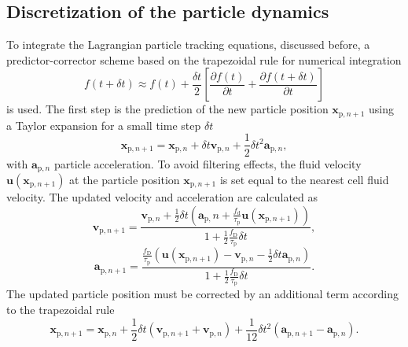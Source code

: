 \documentclass[11pt,a4paper,openany,oneside,parskip=half*]{article}
\renewcommand*\vec[1]{\boldsymbol{#1}}
\begin{document}
\subsection{Discretization of the particle dynamics}
To integrate the Lagrangian particle tracking equations, discussed before, a predictor-corrector scheme based on the trapezoidal rule for numerical integration
\begin{equation}
f (t + \delta t) \approx f(t) + \frac{\delta t}{2} \left[ \frac{\partial f(t)}{\partial t} + \frac{\partial f(t + \delta t)}{\partial t} \right ]
\end{equation}
is used.
\newline
The first step is the prediction of the new particle position $\vec{x}_{\mathrm{p}, n+1}$ using a Taylor expansion for a small time step $\delta t$
\begin{equation}
\vec{x}_{\mathrm{p}, n+1} = \vec{x}_{\mathrm{p}, n} + \delta t \vec{v}_{\mathrm{p}, n} + \frac{1}{2} \delta t^2 \vec{a}_{\mathrm{p}, n},
\end{equation}
with $\vec{a}_{\mathrm{p}, n}$ particle acceleration. 
\newline
To avoid filtering effects, the fluid velocity $\vec{u}(\vec{x}_{\mathrm{p}, n+1})$ at the particle position $\vec{x}_{\mathrm{p}, n+1}$ is set equal to the nearest cell fluid velocity. 
\newline
The updated velocity and acceleration are calculated as
\begin{equation}
\vec{v}_{\mathrm{p}, n+1} = \frac{\vec{v}_{\mathrm{p}, n} + \frac{1}{2} \delta t \left(\vec{a}_{\mathrm{p}, }n + \frac{f_\mathrm{d}}{\tau_\mathrm{p}}\vec{u}(\vec{x}_{\mathrm{p}, n+1}) \right)}{1 + \frac{1}{2} \frac{f_\mathrm{D}}{\tau_\mathrm{p}} \delta t},
\end{equation}
\begin{equation}
\vec{a}_{\mathrm{p}, n+1} = \frac{\frac{f_\mathrm{D}}{\tau_\mathrm{p}} \left(\vec{u}(\vec{x}_{\mathrm{p}, n+1}) - \vec{v}_{\mathrm{p}, n} - \frac{1}{2} \delta t \vec{a}_{\mathrm{p}, n} \right)}{1 + \frac{1}{2} \frac{f_\mathrm{D}}{\tau_\mathrm{p}} \delta t}.
\end{equation}
The updated particle position must be corrected by an additional term according to the trapezoidal rule
\begin{equation}
\vec{x}_{\mathrm{p}, n+1} = \vec{x}_{\mathrm{p}, n} + \frac{1}{2} \delta t \left( \vec{v}_{\mathrm{p}, n+1} + \vec{v}_{\mathrm{p}, n} \right) + \frac{1}{12} \delta t^2 \left( \vec{a}_{\mathrm{p}, n+1} - \vec{a}_{\mathrm{p}, n} \right).
\end{equation}
\newline
\end{document}
